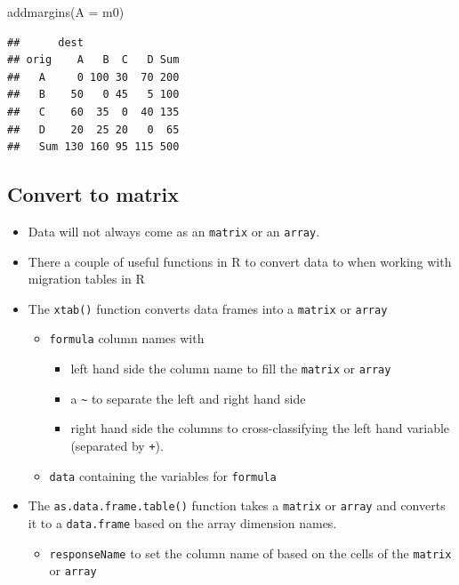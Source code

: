 \documentclass[
]{book}
\newenvironment{Shaded}{\begin{snugshade}}{\end{snugshade}}
\newcommand{\AttributeTok}[1]{\textcolor[rgb]{0.77,0.63,0.00}{#1}}
\newcommand{\FunctionTok}[1]{\textcolor[rgb]{0.00,0.00,0.00}{#1}}
\newcommand{\NormalTok}[1]{#1}
\providecommand{\tightlist}{%
  \setlength{\itemsep}{0pt}\setlength{\parskip}{0pt}}
\begin{document}
\begin{Shaded}
\begin{Highlighting}[]
\FunctionTok{addmargins}\NormalTok{(}\AttributeTok{A =}\NormalTok{ m0)}
\end{Highlighting}
\end{Shaded}

\begin{verbatim}
##      dest
## orig    A   B  C   D Sum
##   A     0 100 30  70 200
##   B    50   0 45   5 100
##   C    60  35  0  40 135
##   D    20  25 20   0  65
##   Sum 130 160 95 115 500
\end{verbatim}

\hypertarget{convert-to-matrix}{%
\subsection{Convert to matrix}\label{convert-to-matrix}}

\begin{itemize}
\tightlist
\item
  Data will not always come as an \texttt{matrix} or an \texttt{array}.
\item
  There a couple of useful functions in R to convert data to when working with migration tables in R
\item
  The \texttt{xtab()} function converts data frames into a \texttt{matrix} or \texttt{array}

  \begin{itemize}
  \tightlist
  \item
    \texttt{formula} column names with

    \begin{itemize}
    \tightlist
    \item
      left hand side the column name to fill the \texttt{matrix} or \texttt{array}
    \item
      a \texttt{\textasciitilde{}} to separate the left and right hand side
    \item
      right hand side the columns to cross-classifying the left hand variable (separated by \texttt{+}).
    \end{itemize}
  \item
    \texttt{data} containing the variables for \texttt{formula}
  \end{itemize}
\item
  The \texttt{as.data.frame.table()} function takes a \texttt{matrix} or \texttt{array} and converts it to a \texttt{data.frame} based on the array dimension names.

  \begin{itemize}
  \tightlist
  \item
    \texttt{responseName} to set the column name of based on the cells of the \texttt{matrix} or \texttt{array}
  \end{itemize}
\end{itemize}
\end{document}
